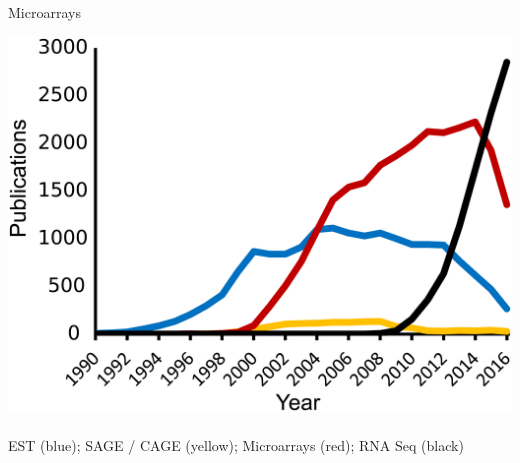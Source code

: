 \documentclass[aspectratio=169,11pt]{beamer}
\begin{document}
%
%
%
%
\begin{frame}{Microarrays}

	\begin{center}
	\includegraphics[scale=0.5]{figures/timeTrends.png}		
	~\\
	\textcolor[rgb]{0.1,0.4,0.7}{EST (blue)};
	\textcolor[rgb]{0.85,0.65,0.15}{SAGE / CAGE (yellow)};
	\textcolor[rgb]{0.7,0,0.2}{Microarrays (red)};  
	RNA Seq (black) 
	\end{center}

\end{frame}
%
%
\end{document}
